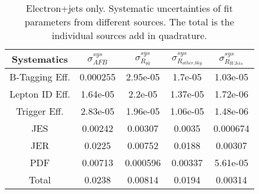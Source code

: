 \documentclass{cmspaperpdf}
\begin{document}
\begin{table}[htb]
\centering
\label{tab:el-sys-err}
\begin{tabular}{ccccc}
Systematics &    $\sigma_{AFB}^{sys}$ & $\sigma_{R_{q\bar{q}}}^{sys}$ & $\sigma_{R_{other\_bkg}}^{sys}$ & $\sigma_{R_{WJets}}^{sys}$ \\
\hline
B-Tagging Eff. &    0.000255 &     2.95e-05 &             1.7e-05 &        1.03e-05 \\
Lepton ID Eff.   &    1.64e-05 &      2.2e-05 &            1.37e-05 &        1.72e-06 \\
Trigger Eff.  &    2.83e-05 &     1.96e-05 &            1.06e-05 &        1.48e-06 \\
JES               &     0.00242 &      0.00307 &              0.0035 &        0.000674 \\
JER               &      0.0225 &      0.00752 &              0.0188 &         0.00307 \\
PDF       &     0.00713 &     0.000596 &             0.00337 &        5.61e-05 \\ \hline
Total         &      0.0238 &      0.00814 &              0.0194 &         0.00314 \\
\hline
\end{tabular}
\caption{Electron+jets only. Systematic uncertainties of fit parameters from different sources. The total is the individual sources add in quadrature. }
\end{table}
\end{document}
